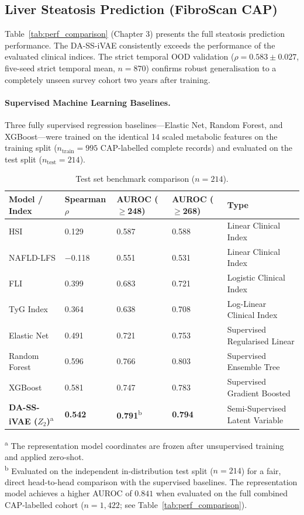 \documentclass[12pt,a4paper,oneside]{report}
\begin{document}
\subsection{Liver Steatosis Prediction (FibroScan CAP)}

Table~\ref{tab:perf_comparison} (Chapter 3) presents the full steatosis prediction performance. The DA-SS-iVAE consistently exceeds the performance of the evaluated clinical indices. The strict temporal OOD validation ($\rho = 0.583 \pm 0.027$, five-seed strict temporal mean, $n = 870$) confirms robust generalisation to a completely unseen survey cohort two years after training.

\paragraph{Supervised Machine Learning Baselines.} Three fully supervised regression baselines---Elastic Net, Random Forest, and XGBoost---were trained on the identical 14 scaled metabolic features on the training split ($n_{\text{train}} = 995$ CAP-labelled complete records) and evaluated on the test split ($n_{\text{test}} = 214$).

\begin{table}[H]
\centering
\caption{Test set benchmark comparison ($n = 214$).}
\label{tab:baselines}
\begin{tabular}{@{}lllll@{}}
\toprule
\textbf{Model / Index} & \textbf{Spearman $\rho$} & \textbf{AUROC ($\geq$248)} & \textbf{AUROC ($\geq$268)} & \textbf{Type} \\ \midrule
HSI            & 0.129          & 0.587 & 0.588 & Linear Clinical Index \\
NAFLD-LFS      & $-$0.118       & 0.551 & 0.531 & Linear Clinical Index \\
FLI            & 0.399          & 0.683 & 0.721 & Logistic Clinical Index \\
TyG Index      & 0.364          & 0.638 & 0.708 & Log-Linear Clinical Index \\
Elastic Net    & 0.491          & 0.721 & 0.753 & Supervised Regularised Linear \\
Random Forest  & 0.596          & 0.766 & 0.803 & Supervised Ensemble Tree \\
XGBoost        & 0.581          & 0.747 & 0.783 & Supervised Gradient Boosted \\
\textbf{DA-SS-iVAE ($Z_2$)}\textsuperscript{a} & \textbf{0.542} & \textbf{0.791}\textsuperscript{b} & \textbf{0.794} & Semi-Supervised Latent Variable \\ \bottomrule
\end{tabular}
\par\smallskip\raggedright\footnotesize
\textsuperscript{a} The representation model coordinates are frozen after unsupervised training and applied zero-shot. \\
\textsuperscript{b} Evaluated on the independent in-distribution test split ($n=214$) for a fair, direct head-to-head comparison with the supervised baselines. The representation model achieves a higher AUROC of $0.841$ when evaluated on the full combined CAP-labelled cohort ($n=1{,}422$; see Table~\ref{tab:perf_comparison}).
\end{table}
\end{document}
